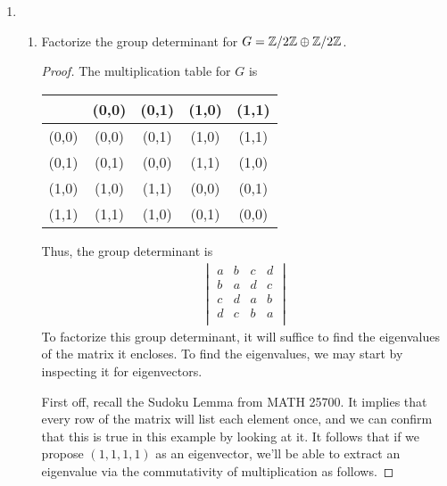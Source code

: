 \documentclass[../psets.tex]{subfiles}
\begin{document}
\begin{enumerate}
\begin{enumerate}
\begin{proof}
        \end{proof}
    \end{enumerate}
    \item 
    \begin{enumerate}
        \item Factorize the group determinant for $G=\mathbb{Z}/2\mathbb{Z}\oplus\mathbb{Z}/2\mathbb{Z}$.
        \begin{proof}
            The multiplication table for $G$ is
            \begin{center}
                \small
                \renewcommand{\arraystretch}{1.2}
                \begin{tabular}{c|c|c|c|c|}
                          & (0,0) & (0,1) & (1,0) & (1,1)\\ \hline
                    (0,0) & (0,0) & (0,1) & (1,0) & (1,1)\\ \hline
                    (0,1) & (0,1) & (0,0) & (1,1) & (1,0)\\ \hline
                    (1,0) & (1,0) & (1,1) & (0,0) & (0,1)\\ \hline
                    (1,1) & (1,1) & (1,0) & (0,1) & (0,0)\\ \hline
                \end{tabular}
            \end{center}
            Thus, the group determinant is
            \begin{align*}
                \begin{vmatrix}
                    a & b & c & d\\
                    b & a & d & c\\
                    c & d & a & b\\
                    d & c & b & a\\
                \end{vmatrix}
            \end{align*}
            To factorize this group determinant, it will suffice to find the eigenvalues of the matrix it encloses. To find the eigenvalues, we may start by inspecting it for eigenvectors.\par
            First off, recall the Sudoku Lemma from MATH 25700. It implies that every row of the matrix will list each element once, and we can confirm that this is true in this example by looking at it. It follows that if we propose $(1,1,1,1)$ as an eigenvector, we'll be able to extract an eigenvalue via the commutativity of multiplication as follows.

\end{proof}
\end{enumerate}
\end{enumerate}
\end{document}
